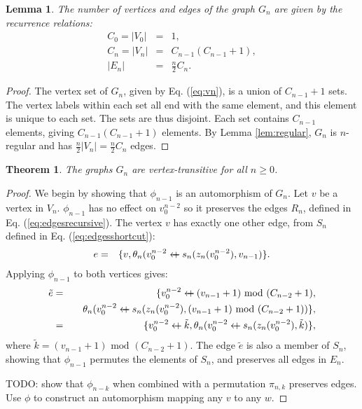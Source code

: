 \documentclass{article}
\newcommand{\beq}{\begin{eqnarray}}
\newcommand{\eeq}{\end{eqnarray}}
\newcommand{\append}{\leftarrow{\mkern-18mu}{+}\:}
\newtheorem{lemma}{Lemma}
\newtheorem{theorem}{Theorem}
\begin{document}
\begin{lemma}
The number of vertices and edges of the graph $G_n$ are given by the recurrence
relations:
\beq
C_0 = |V_0| &=& 1, \\
\label{eq:cnrec}C_{n} = |V_{n}| &=& C_{n-1} (C_{n-1} + 1), \\
|E_n| &=& \frac{n}{2} C_n.
\eeq
\end{lemma}
\begin{proof}
The vertex set of $G_n$, given by Eq. (\ref{eq:vn}), is a union of
$C_{n-1} + 1$ sets.
The vertex labels within each set all end with the same element,
and this element is unique to each set.
The sets are thus disjoint.
Each set contains $C_{n-1}$ elements, giving $C_{n-1}(C_{n-1} + 1)$
elements.
By Lemma \ref{lem:regular}, $G_n$ is $n$-regular and has
$\frac{n}{2}|V_n| = \frac{n}{2}C_n$ edges.
\end{proof}
\begin{theorem}
The graphs $G_n$ are vertex-transitive for all $n \geq 0$.
\end{theorem}
\begin{proof}
We begin by showing that $\phi_{n-1}$ is an automorphism of $G_n$.
Let $v$ be a vertex in $V_n$.
$\phi_{n-1}$ has no effect on $v_0^{n-2}$ so it preserves the edges $R_n$,
defined in Eq. (\ref{eq:edgesrecursive}).
The vertex $v$ has exactly one other edge, from $S_n$ defined in
Eq. (\ref{eq:edgesshortcut}):
\beq
e &=& \{ v, \theta_n(v_0^{n-2} \append s_n(z_n(v_0^{n-2}), v_{n-1}) \}.
\eeq
Applying $\phi_{n-1}$ to both vertices gives:
\beq
\tilde{e} &=&
\{ v_0^{n-2} \append (v_{n-1} + 1) \mbox{ mod } (C_{n-2} + 1), \\
&& \quad \theta_n(v_0^{n-2} \append
s_n(z_n(v_0^{n-2}), (v_{n-1} + 1) \mbox{ mod } (C_{n-2} + 1) ) \},
\\
&=&
\{ v_0^{n-2} \append \tilde{k},
\theta_n(v_0^{n-2} \append s_n(z_n(v_0^{n-2}), \tilde{k}) \},
\eeq
where $\tilde{k} = (v_{n-1} + 1) \mbox{ mod } (C_{n-2} + 1)$.
The edge $\tilde{e}$ is also a member of $S_n$,
showing that $\phi_{n-1}$ permutes the elements of $S_n$,
and preserves all edges in $E_n$.

TODO: show that $\phi_{n-k}$ when combined with a permutation $\pi_{n,k}$
preserves edges. Use $\phi$ to construct an automorphism mapping any $v$ to
any $w$.
\end{proof}



\end{document}

